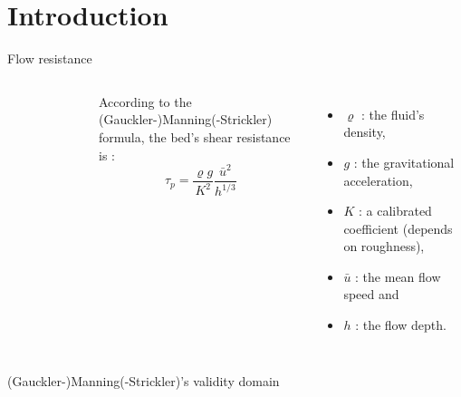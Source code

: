 \section{Introduction}

\begin{frame}{Flow resistance}
    \begin{columns}
        \begin{figure}
            
        \end{figure}
            According to the (Gauckler-)Manning(-Strickler) formula, the bed's shear resistance is :
            $$\tau_p = \frac{\varrho g}{K^2}\frac{\bar{u}^2}{h^{1/3}}$$
            \begin{itemize}
                \item $\varrho$ : the fluid's density,
                \item $g$ : the gravitational acceleration,
                \item $K$ : a calibrated coefficient (depends on roughness),
                \item $\bar u$ : the mean flow speed and
                \item $h$ : the flow depth.
            \end{itemize}
    \end{columns}
    
\end{frame}

\begin{frame}{(Gauckler-)Manning(-Strickler)'s validity domain}

    \begin{figure}
        
        \label{fig:noise}
    \end{figure}

\end{frame}

